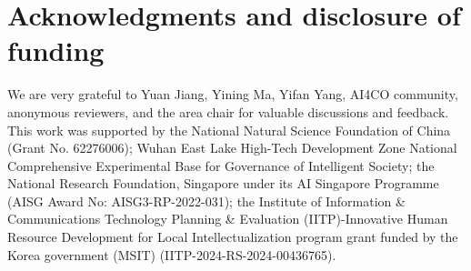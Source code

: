 \section*{Acknowledgments and disclosure of funding}
We are very grateful to Yuan Jiang, Yining Ma, Yifan Yang, AI4CO community, anonymous reviewers, and the area chair for valuable discussions and feedback.
This work was supported by the National Natural Science Foundation of China (Grant No. 62276006); Wuhan East Lake High-Tech Development Zone National Comprehensive Experimental Base for Governance of Intelligent Society; the National Research Foundation, Singapore under its AI Singapore Programme (AISG Award No: AISG3-RP-2022-031); the Institute of Information \& Communications Technology Planning \& Evaluation (IITP)-Innovative Human Resource Development for Local Intellectualization program grant funded by the Korea government (MSIT) (IITP-2024-RS-2024-00436765).